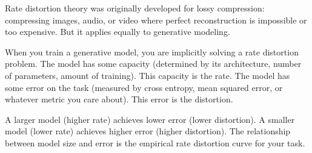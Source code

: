 Rate distortion theory was originally developed for lossy compression: compressing images, audio, or video where perfect reconstruction is impossible or too expensive. But it applies equally to generative modeling.

When you train a generative model, you are implicitly solving a rate distortion problem. The model has some capacity (determined by its architecture, number of parameters, amount of training). This capacity is the rate. The model has some error on the task (measured by cross entropy, mean squared error, or whatever metric you care about). This error is the distortion.

A larger model (higher rate) achieves lower error (lower distortion). A smaller model (lower rate) achieves higher error (higher distortion). The relationship between model size and error is the empirical rate distortion curve for your task.

\vspace{1.5em}

